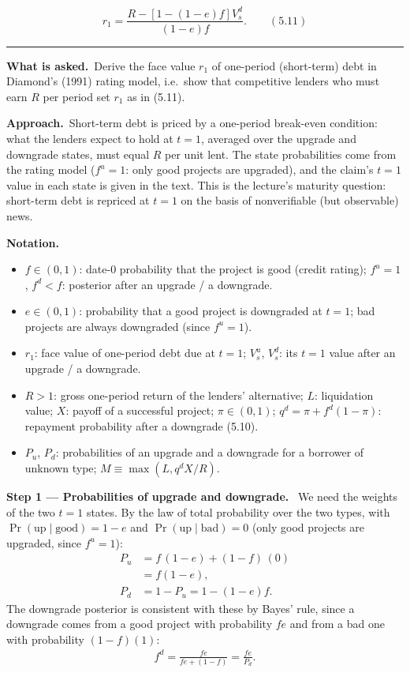 \documentclass[11pt,a4paper]{article}
\newcommand{\notation}{\par\noindent\textbf{Notation.}}
\newcommand{\step}[2]{\par\medskip\noindent\textbf{Step #1 --- #2.}~}
\newcommand{\asked}{\par\medskip\noindent\textbf{What is asked.}~}
\newcommand{\approach}{\par\smallskip\noindent\textbf{Approach.}~}
\newcommand{\stmtend}{\par\endgroup\nopagebreak\noindent\rule{\linewidth}{0.4pt}\par\medskip}
\begin{document}
\[r_1 = \frac{R - [1 - (1 - e)f]V_s^d}{(1 - e)f}. \qquad (5.11)\]
\stmtend

\asked Derive the face value $r_1$ of one-period (short-term) debt in Diamond's (1991) rating model,
i.e.\ show that competitive lenders who must earn $R$ per period set $r_1$ as in (5.11).

\approach Short-term debt is priced by a one-period break-even condition: what the lenders expect to
hold at $t=1$, averaged over the upgrade and downgrade states, must equal $R$ per unit lent. The state
probabilities come from the rating model ($f^u=1$: only good projects are upgraded), and the claim's
$t=1$ value in each state is given in the text. This is the lecture's maturity question: short-term
debt is repriced at $t=1$ on the basis of nonverifiable (but observable) news.

\notation
\begin{itemize}
  \item $f\in(0,1)$: date-0 probability that the project is good (credit rating); $f^u=1$, $f^d<f$: posterior after an upgrade / a downgrade.
  \item $e\in(0,1)$: probability that a good project is downgraded at $t=1$; bad projects are always downgraded (since $f^u=1$).
  \item $r_1$: face value of one-period debt due at $t=1$; $V_s^u$, $V_s^d$: its $t=1$ value after an upgrade / a downgrade.
  \item $R>1$: gross one-period return of the lenders' alternative; $L$: liquidation value; $X$: payoff of a successful project; $\pi\in(0,1)$; $q^d=\pi+f^d(1-\pi)$: repayment probability after a downgrade (5.10).
  \item $P_u$, $P_d$: probabilities of an upgrade and a downgrade for a borrower of unknown type; $M\equiv\max(L,q^dX/R)$.
\end{itemize}

\step{1}{Probabilities of upgrade and downgrade} We need the weights of the two $t=1$ states. By the
law of total probability over the two types, with $\Pr(\text{up}\mid\text{good})=1-e$ and
$\Pr(\text{up}\mid\text{bad})=0$ (only good projects are upgraded, since $f^u=1$):
\begin{align}
  P_u &= f\,(1-e)+(1-f)\,(0) \nonumber\\
      &= f(1-e), \label{t5e2-Pu}\\
  P_d &= 1-P_u = 1-(1-e)f. \label{t5e2-Pd}
\end{align}
The downgrade posterior is consistent with these by Bayes' rule, since a downgrade comes from a good
project with probability $fe$ and from a bad one with probability $(1-f)(1)$:
\begin{align}
  f^d = \frac{fe}{fe+(1-f)} = \frac{fe}{P_d}. \label{t5e2-bayes}
\end{align}
\end{document}
